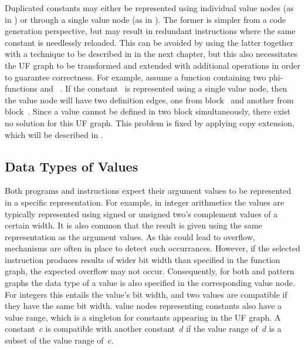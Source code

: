 Duplicated constants may either be represented using individual \glspl{value
  node} (as in ) or through a single
\gls{value node} (as in ).
%
The former is simpler from a \gls{code generation} perspective, but may result
in redundant \glspl{instruction} where the same constant is needlessly reloaded.
%
This can be avoided by using the latter together with a technique to be
described in  in the next chapter, but this
also necessitates the \gls{UF graph} to be transformed and extended with
additional \glspl{operation} in order to guarantee correctness.
%
For example, assume a \gls{function} containing two \glspl{phi-function}
\mbox{\irFont {}} and \mbox{\irFont
  }.
%
If the constant~ is represented using a single \gls{value node}, then
the \gls{value node} will have two \glspl{definition edge}, one from
\gls{block}~ and another from \gls{block}~.
%
Since a value cannot be defined in two \gls{block} simultaneously, there exist
no \gls{solution} for this \gls{UF graph}.
%
This problem is fixed by applying \gls{copy extension}, which will be described
in .


\subsection{Data Types of Values}

Both \glspl{program} and \glspl{instruction} expect their argument values to be
represented in a specific representation.
%
For example, in integer arithmetics the values are typically represented using
signed or unsigned two's complement values of a certain width.
%
It is also common that the result is given using the same representation as the
argument values.
%
As this could lead to overflow, mechanisms are often in place to detect such
occurrances.
%
However, if the selected \gls{instruction} produces results of wider bit width
than specified in the \gls{function graph}, the expected overflow may not occur.
%
Consequently, for both  and \glspl{pattern graph} the
data type of a value is also specified in the corresponding \gls{value node}.
%
For integers this entails the value's bit width, and two values are compatible
if they have the same bit width.
%
\Glspl{value node} representing constants also have a value range, which is a
singleton for constants appearing in the \gls{UF graph}.
%
A constant~$c$ is compatible with another constant~$d$ if the value range of~$d$
is a subset of the value range of~$c$.


